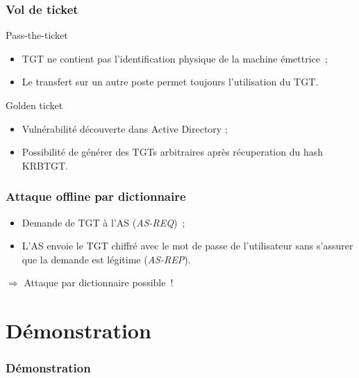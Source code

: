 \documentclass[svgnames]{beamer}
\begin{document}
\begin{frame}
 \frametitle{Vol de ticket}
 
 
 \begin{block}{Pass-the-ticket}
  \begin{itemize}
   \item TGT ne contient pas l'identification physique de la machine émettrice~;
   \item Le transfert sur un autre poste permet toujours l'utilisation du TGT.
  \end{itemize}
 \end{block}
 
 \begin{block}{Golden ticket}
  \begin{itemize}
   \item Vulnérabilité découverte dans Active Directory ;
   \item Possibilité de générer des TGTs arbitraires après récuperation du hash KRBTGT.
  \end{itemize}
 \end{block}
\end{frame}


\begin{frame}
 \frametitle{Attaque offline par dictionnaire}
   \begin{itemize}
   \item Demande de TGT à l'AS (\textit{AS-REQ})~;
   \item L'AS envoie le TGT chiffré avec le mot de passe de l'utilisateur sans s'assurer que la demande est légitime (\textit{AS-REP}).
  \end{itemize}
  
  $\Rightarrow$ Attaque par dictionnaire possible~! %
 
 
\end{frame}


\section{Démonstration}

\begin{frame}
  \frametitle{Démonstration}
\end{frame}
\end{document}
